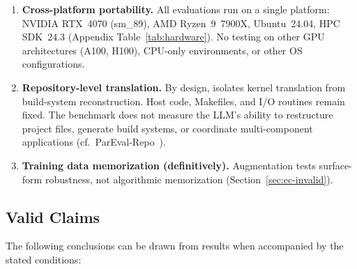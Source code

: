 \begin{enumerate}
  \item \textbf{Cross-platform portability.} All evaluations run on a single
    platform: NVIDIA RTX~4070 (sm\_89), AMD Ryzen~9~7900X, Ubuntu~24.04, HPC
    SDK~24.3 (Appendix Table~\ref{tab:hardware}). No testing on other GPU
    architectures (A100, H100), CPU-only environments, or other OS
    configurations.

  \item \textbf{Repository-level translation.} By design, \parbench{} isolates
    kernel translation from build-system reconstruction. Host code, Makefiles,
    and I/O routines remain fixed. The benchmark does not measure the LLM's
    ability to restructure project files, generate build systems, or coordinate
    multi-component applications (cf.\
    ParEval-Repo~\cite{ParEvalRepo2025}).

  \item \textbf{Training data memorization (definitively).} Augmentation tests
    surface-form robustness, not algorithmic memorization
    (Section~\ref{sec:ec-invalid}).
\end{enumerate}

\subsection{Valid Claims}
\label{sec:ec-valid}

The following conclusions can be drawn from \parbench{} results when
accompanied by the stated conditions:

